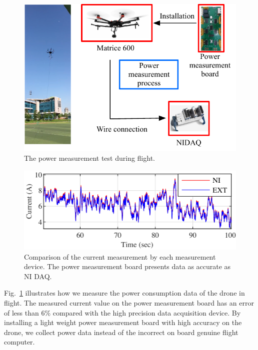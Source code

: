 \documentclass[journal]{./template/IEEEtran}
\begin{document}
\begin{figure}[ht]
\centering
\includegraphics[scale=0.80]{fig3/flight_experiment.pdf}
\caption{The power measurement test during flight.}
\label{fig:flight_test}
\end{figure}

\begin{figure}[ht]
\centering
\includegraphics[scale=1.05]{fig4/flight_exp_result.pdf}
\caption{Comparison of the current measurement by each measurement device. The power measurement board presents data as accurate as NI DAQ.}
\end{figure}
\label{Section: Design the power measurement board}

Fig.~\ref{fig:flight_test} illustrates how we measure the power consumption data of the drone in flight.
The measured current value on the power measurement board has an error of less than 6\% compared with the high precision data acquisition device. By installing a light weight power measurement board with high accuracy on the drone, we collect power data instead of the incorrect on board genuine flight computer.
\end{document}
